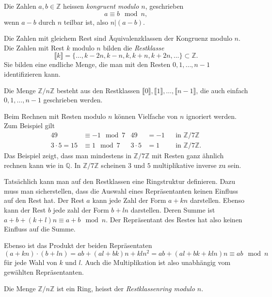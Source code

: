 \begin{definition}
Die Zahlen $a,b\in\mathbb{Z}$ heissen {\em kongruent modulo $n$},
geschrieben
\[
a\equiv b\mod n,
\]
wenn $a-b$ durch $n$ teilbar ist, also $n|(a-b)$.
\end{definition}

Die Zahlen mit gleichem Rest sind Äquivalenzklassen der Kongruenz modulo $n$.
Die Zahlen mit Rest $k$ modulo $n$ bilden die {\em Restklasse}
\[
\llbracket k\rrbracket=\{\dots,k-2n,k-n,k,k+n,k+2n,\dots\} \subset\mathbb{Z}.
\]
Sie bilden eine endliche Menge, die man mit den Resten $0,1,\dots,n-1$
identifizieren kann.

\begin{definition}
Die Menge $\mathbb{Z}/n\mathbb{Z}$ besteht aus den Restklassen
$\llbracket 0\rrbracket,\llbracket 1\rrbracket,\dots,\llbracket n-1\rrbracket$,
die auch einfach $0,1,\dots,n-1$ geschrieben werden.
\end{definition}

Beim Rechnen mit Resten modulo $n$ können Vielfache von $n$ ignoriert werden.
Zum Beispiel gilt 
\[
\begin{aligned}
49&\equiv -1\mod 7& 49&=-1&&\text{in $\mathbb{Z}/7\mathbb{Z}$}
\\
3\cdot 5=15&\equiv 1\mod 7 & 3\cdot 5&=1&&\text{in $\mathbb{Z}/7\mathbb{Z}$.}
\end{aligned}
\]
Das Beispiel zeigt, dass man mindestens in $\mathbb{Z}/7\mathbb{Z}$ mit
Resten ganz ähnlich rechnen kann wie in $\mathbb{Q}$.
In $\mathbb{Z}/7\mathbb{Z}$ scheinen $3$ und $5$ multiplikative inverse
zu sein.

Tatsächlich kann man auf den Restklassen eine Ringstruktur definieren.
Dazu muss man sicherstellen, dass die Auswahl eines Repräsentanten keinen
Einfluss auf den Rest hat.
Der Rest $a$ kann jede Zahl der Form $a+kn$ darstellen.
Ebenso kann der Rest $b$ jede zahl der Form $b+ln$ darstellen.
Deren Summe ist $a+b+(k+l)n\equiv a+b\mod n$.
Der Repräsentant des Restes hat also keinen Einfluss auf die Summe.

Ebenso ist das Produkt der beiden Repräsentaten 
$(a+kn)\cdot(b+ln) = ab + (al+bk)n + kln^2=ab + (al+bk+kln)n\equiv ab\mod n$
für jede Wahl von $k$ und $l$.
Auch die Multiplikation ist also unabhängig vom gewählten Repräsentanten.

\begin{definition}
Die Menge $\mathbb{Z}/n\mathbb{Z}$ ist ein Ring,
heisst der {\em Restklassenring modulo $n$}.
\end{definition}

